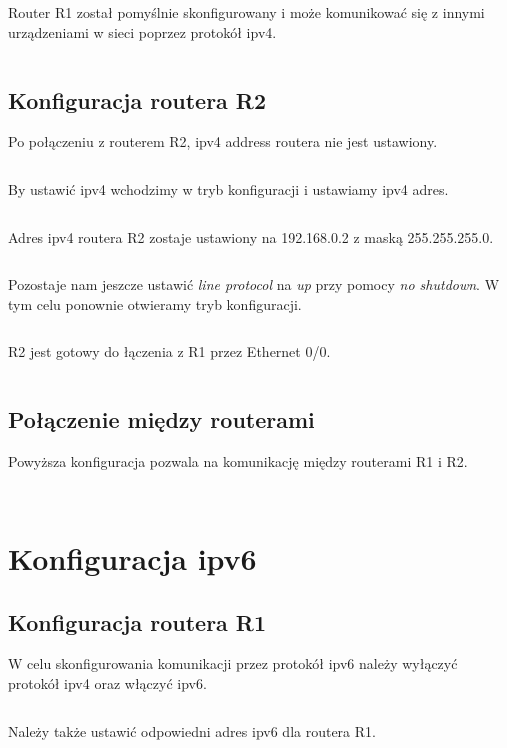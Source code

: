 \documentclass[a4paper,12pt,notitlepage]{article}
\begin{document}
Router R1 został pomyślnie skonfigurowany i może komunikować się z innymi urządzeniami w sieci poprzez protokół ipv4.%
\inputminted[label=Końcowa konfiguracja routera R1, firstline=129, lastline=154]{text}{R1.txt}

\subsection{Konfiguracja routera R2}

Po połączeniu z routerem R2, ipv4 address routera nie jest ustawiony.
\inputminted[label=Output, firstline=88, lastline=111]{text}{R2.txt}
By ustawić ipv4 wchodzimy w tryb konfiguracji i ustawiamy ipv4 adres.
\inputminted[label=Output, firstline=113, lastline=120]{text}{R2.txt}
Adres ipv4 routera R2 zostaje ustawiony na 192.168.0.2 z maską 255.255.255.0.
\inputminted[label=Output, firstline=121, lastline=144]{text}{R2.txt}
Pozostaje nam jeszcze ustawić \textit{line protocol} na \textit{up} przy pomocy \textit{no shutdown}. W tym celu ponownie otwieramy tryb konfiguracji.
\inputminted[label=Output, firstline=147, lastline=157]{text}{R2.txt}
R2 jest gotowy do łączenia z R1 przez Ethernet 0/0.
\inputminted[label=Output, firstline=162, lastline=185]{text}{R2.txt}

\subsection{Połączenie między routerami}

Powyższa konfiguracja pozwala na komunikację między routerami R1 i R2.%
\inputminted[label=Próba komunikacji R2 z R1, firstline=211, lastline=216]{text}{R2.txt}%
\inputminted[label=Próba komunikacji R1 z R2, firstline=155, lastline=160]{text}{R1.txt}

\section{Konfiguracja ipv6}

\subsection{Konfiguracja routera R1}

W celu skonfigurowania komunikacji przez protokół ipv6 należy wyłączyć protokół ipv4 oraz włączyć ipv6.%
\inputminted[label=Przełączanie na ipv6, firstline=171, lastline=177]{text}{R1.txt}

Należy także ustawić odpowiedni adres ipv6 dla routera R1.%
\inputminted[label=Ustawianie adresu ipv6 dla R1, firstline=237, lastline=238]{text}{R1.txt}
\end{document}
